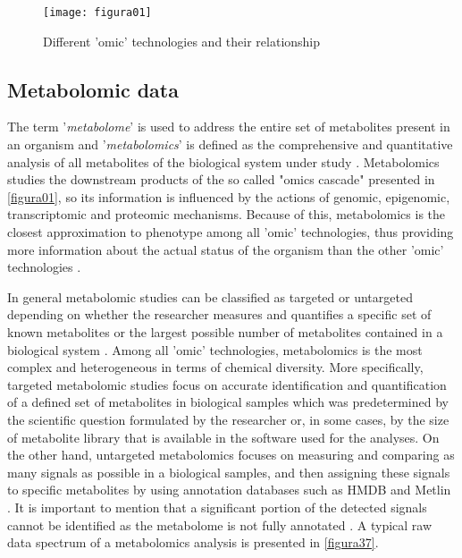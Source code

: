 \begin{figure}[htbp]\centering
		\texttt{[image: figura01]}
		\caption{Different 'omic' technologies and their relationship}
		\label{figura01}
	\end{figure}



\subsection{Metabolomic data}
The term '\textit{metabolome}' is used to address the entire set of metabolites present in an organism and '\textit{metabolomics}' is defined as the comprehensive and quantitative analysis of all metabolites of the biological system under study \parencite{fiehn2001combining}. Metabolomics studies the downstream products of the so called "omics cascade" presented in \autoref{figura01}, so its information is influenced by the actions of genomic, epigenomic, transcriptomic and proteomic mechanisms. Because of this, metabolomics is the closest approximation to phenotype among all 'omic' technologies, thus providing  more information about the actual status of the organism than the other 'omic' technologies \parencite{beger2016metabolomics}. 

In general metabolomic studies can be classified as targeted or untargeted depending on whether the researcher measures and quantifies a specific set of known metabolites or the largest possible number of metabolites contained in a biological system \parencite{orevsivc2009metabolomics}. 
Among all 'omic' technologies, metabolomics is the most complex and heterogeneous in terms of chemical diversity. More specifically, targeted metabolomic studies focus on accurate identification and quantification of a defined set of metabolites in biological samples which was predetermined by the scientific question formulated by the researcher or, in some cases, by the size of metabolite library that is available in the software used for the analyses. On the other hand, untargeted metabolomics focuses on measuring and comparing as many signals as possible in a biological samples, and then assigning these signals to specific metabolites by using annotation databases such as HMDB \parencite{wishart2007hmdb} and Metlin \parencite{smith2005metlin}. It is important to mention that a significant portion of the detected signals cannot be identified as the metabolome is not fully annotated \parencite{viant2017close}. A typical raw data spectrum of a metabolomics analysis is presented in \autoref{figura37}.

